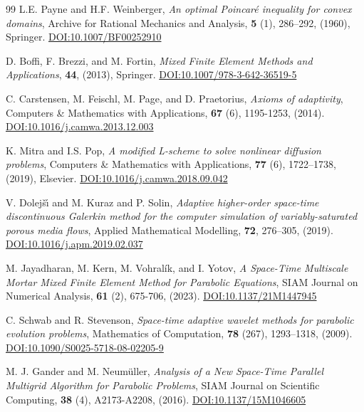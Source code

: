 \documentclass[review,11pt]{article}
\numberwithin{equation}{section}
\begin{document}
\begin{thebibliography}{99}
L.E. Payne and H.F. Weinberger, \emph{An optimal {Poincar\'e} inequality for convex domains}, Archive for Rational Mechanics and Analysis, \textbf{5} (1), 286--292, (1960), Springer. \href{https://doi.org/10.1007/BF00252910}{DOI:10.1007/BF00252910}

D. Boffi, F. Brezzi, and M. Fortin, \emph{{Mixed Finite Element Methods} and {Applications}}, \textbf{44}, (2013), Springer. \href{https://doi.org/10.1007/978-3-642-36519-5}{DOI:10.1007/978-3-642-36519-5}

C. Carstensen, M. Feischl, M. Page, and D. Praetorius, \emph{Axioms of adaptivity}, Computers \& Mathematics with Applications, \textbf{67} (6), 1195-1253, (2014). \href{https://doi.org/10.1016/j.camwa.2013.12.003}{DOI:10.1016/j.camwa.2013.12.003}

K. Mitra and I.S. Pop, \emph{A modified {L}-scheme to solve nonlinear diffusion problems}, Computers \& Mathematics with Applications, \textbf{77} (6), 1722--1738, (2019), Elsevier. \href{https://doi.org/10.1016/j.camwa.2018.09.042}{DOI:10.1016/j.camwa.2018.09.042}

V. Dolej\v{s}\'{\i} and M. Kuraz
and P.  Solin, \emph{Adaptive higher-order space-time discontinuous {G}alerkin 
method for the computer simulation of variably-saturated 
porous media flows}, Applied Mathematical Modelling, \textbf{72}, 276--305, (2019). \href{https://doi.org/10.1016/j.apm.2019.02.037}{DOI:10.1016/j.apm.2019.02.037}

M. Jayadharan, M. Kern, M. Vohral\'ik, and I. Yotov, \emph{A Space-Time Multiscale Mortar Mixed Finite Element Method for Parabolic Equations}, SIAM Journal on Numerical Analysis, \textbf{61} (2), 675-706, (2023). \href{https://doi.org/10.1137/21M1447945}{DOI:10.1137/21M1447945}

C. Schwab and R. Stevenson, \emph{Space-time adaptive wavelet methods for parabolic evolution problems}, Mathematics of Computation, \textbf{78} (267), 1293--1318, (2009). \href{https://doi.org/10.1090/S0025-5718-08-02205-9}{DOI:10.1090/S0025-5718-08-02205-9}

M. J. Gander and M. Neum\"uller, \emph{{Analysis} of a {New Space-Time Parallel Multigrid Algorithm} for {Parabolic Problems}}, SIAM Journal on Scientific Computing, \textbf{38} (4), A2173-A2208, (2016). \href{https://doi.org/10.1137/15M1046605}{DOI:10.1137/15M1046605}



\end{thebibliography}
\end{document}

